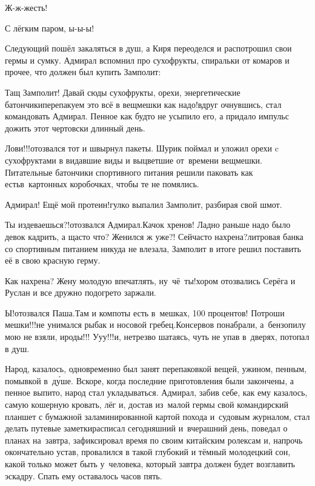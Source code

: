 \diagdash Ж-ж-жесть! 

\diagdash С лёгким паром, ы-ы-ы!

Следующий пошёл закаляться в душ, а Киря переоделся и распотрошил свои гермы и сумку. Адмирал вспомнил про сухофрукты, спиральки от комаров и прочее, что должен был купить Замполит:

\diagdash Тащ Замполит! Давай сюды сухофрукты, орехи, энергетические батончики\mdash перепакуем это всё в вещмешки как надо!\mdash вдруг очнувшись, стал командовать Адмирал. Пенное как будто не усыпило его, а придало импульс дожить этот чертовски длинный день. 

\diagdash Лови!!!\mdash отозвался тот и швырнул пакеты. Шурик поймал и уложил орехи c сухофруктами в видавшие виды и выцветшие от~времени вещмешки. Питательные батончики спортивного питания решили паковать как есть\mdash в~картонных коробочках, чтобы те не помялись.

\diagdash Адмирал! Ещё мой протеин!\mdash гулко выпалил Замполит, разбирая свой шмот.

\diagdash Ты издеваешься?!\mdash отозвался Адмирал.\mdash Качок хренов! Ладно раньше надо было девок кадрить, а щас\sdash то что? Женился ж уже?! Сейчас\sdash то нахрена?\sdash литровая банка со спортивным питанием никуда не влезала, Замполит в итоге решил поставить её в свою красную герму.

\diagdash Как нахрена? Жену молодую впечатлять, ну~чё~ты!\mdash хором отозвались Серёга и Руслан и все дружно подогрето заржали.

\diagdash Ы!\mdash отозвался Паша.\mdash Там и компоты есть в~мешках, 100 процентов! Потроши мешки!!!\mdash не унимался рыбак и носовой гребец.\mdash Консервов понабрали, а~бензопилу мою не взяли, ироды!!! У\sdash у\sdash у!!!\mdash и, нетрезво шатаясь, чуть не упав в~дверях, потопал в душ.

Народ, казалось, одновременно был занят перепаковкой вещей, ужином, пенным, помывкой в~д\'{у}ше. Вскоре, когда последние приготовления были закончены, а пенное выпито, народ стал укладываться. Адмирал, забив себе, как ему казалось, самую кошерную кровать, лёг и, достав из~малой гермы свой командирский планшет с бумажной заламинированной картой похода и~судовым журналом, стал делать путевые заметки\mdash расписал сегодняшний и~вчерашний день, поведал о планах на~завтра, зафиксировал время по своим китайским ролексам и, напрочь окончательно устав, провалился в такой глубокий и тёмный молодецкий сон, какой только может быть у~человека, который завтра должен будет возглавить эскадру. Спать ему оставалось часов пять.

\begin{center}
\end{center}

 






